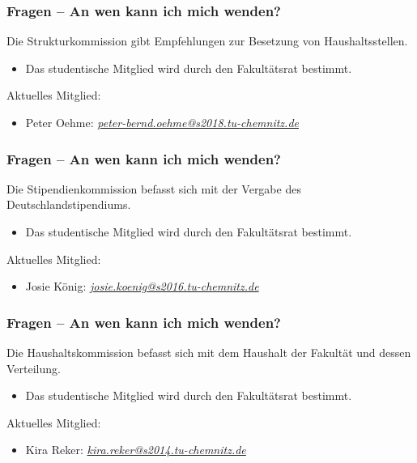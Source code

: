 \documentclass[10pt]{beamer}
\begin{document}
\begin{frame}
\frametitle{Fragen -- An wen kann ich mich wenden?}
\begin{block}{\vphantom{X}}
	Die Strukturkommission gibt Empfehlungen zur Besetzung von Haushaltsstellen.
\end{block}
\begin{itemize}
	\item Das studentische Mitglied wird durch den Fakultätsrat bestimmt.
\end{itemize}
Aktuelles Mitglied:
\begin{itemize}
	\item Peter Oehme: \textit{\href{mailto:peter-bernd.oehme@s2018.tu-chemnitz.de}{peter-bernd.oehme@s2018.tu-chemnitz.de}}
\end{itemize}
\end{frame}

\begin{frame}
\frametitle{Fragen -- An wen kann ich mich wenden?}
\begin{block}{\vphantom{X}}
	Die Stipendienkommission befasst sich mit der Vergabe des Deutschlandstipendiums.
\end{block}
\begin{itemize}
	\item Das studentische Mitglied wird durch den Fakultätsrat bestimmt.
\end{itemize}
Aktuelles Mitglied:
\begin{itemize}
	\item Josie König: \textit{\href{mailto:josie.koenig@s2016.tu-chemnitz.de}{josie.koenig@s2016.tu-chemnitz.de}}
\end{itemize}
\end{frame}

\begin{frame}
\frametitle{Fragen -- An wen kann ich mich wenden?}
\begin{block}{\vphantom{X}}
	Die Haushaltskommission befasst sich mit dem Haushalt der Fakultät und dessen Verteilung.
\end{block}
\begin{itemize}
	\item Das studentische Mitglied wird durch den Fakultätsrat bestimmt.
\end{itemize}
Aktuelles Mitglied:
\begin{itemize}
	\item Kira Reker: \textit{\href{mailto:kira.reker@s2014.tu-chemnitz.de}{kira.reker@s2014.tu-chemnitz.de}}   
\end{itemize}
\end{frame}
\end{document}
